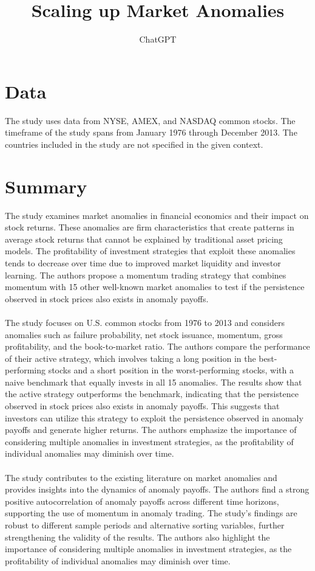 \documentclass{article}
\title{Scaling up Market Anomalies}
\author{ChatGPT}
\begin{document}
 

\maketitle
\section{Data}
The study uses data from NYSE, AMEX, and NASDAQ common stocks. The timeframe of the study spans from January 1976 through December 2013. The countries included in the study are not specified in the given context. 
\section{Summary}
The study examines market anomalies in financial economics and their impact on stock returns. These anomalies are firm characteristics that create patterns in average stock returns that cannot be explained by traditional asset pricing models. The profitability of investment strategies that exploit these anomalies tends to decrease over time due to improved market liquidity and investor learning. The authors propose a momentum trading strategy that combines momentum with 15 other well-known market anomalies to test if the persistence observed in stock prices also exists in anomaly payoffs.  \\
\\
The study focuses on U.S. common stocks from 1976 to 2013 and considers anomalies such as failure probability, net stock issuance, momentum, gross profitability, and the book-to-market ratio. The authors compare the performance of their active strategy, which involves taking a long position in the best-performing stocks and a short position in the worst-performing stocks, with a naive benchmark that equally invests in all 15 anomalies. The results show that the active strategy outperforms the benchmark, indicating that the persistence observed in stock prices also exists in anomaly payoffs. This suggests that investors can utilize this strategy to exploit the persistence observed in anomaly payoffs and generate higher returns. The authors emphasize the importance of considering multiple anomalies in investment strategies, as the profitability of individual anomalies may diminish over time.  \\
\\
The study contributes to the existing literature on market anomalies and provides insights into the dynamics of anomaly payoffs. The authors find a strong positive autocorrelation of anomaly payoffs across different time horizons, supporting the use of momentum in anomaly trading. The study's findings are robust to different sample periods and alternative sorting variables, further strengthening the validity of the results. The authors also highlight the importance of considering multiple anomalies in investment strategies, as the profitability of individual anomalies may diminish over time.  \\
\end{document}
